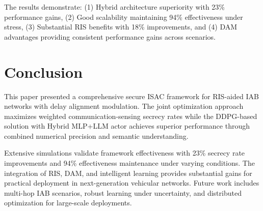 \documentclass[conference]{IEEEtran}
\begin{document}
The results demonstrate: (1) Hybrid architecture superiority with 23\% performance gains, (2) Good scalability maintaining 94\% effectiveness under stress, (3) Substantial RIS benefits with 18\% improvements, and (4) DAM advantages providing consistent performance gains across scenarios.

\section{Conclusion}

This paper presented a comprehensive secure ISAC framework for RIS-aided IAB networks with delay alignment modulation. The joint optimization approach maximizes weighted communication-sensing secrecy rates while the DDPG-based solution with Hybrid MLP+LLM actor achieves superior performance through combined numerical precision and semantic understanding.

Extensive simulations validate framework effectiveness with 23\% secrecy rate improvements and 94\% effectiveness maintenance under varying conditions. The integration of RIS, DAM, and intelligent learning provides substantial gains for practical deployment in next-generation vehicular networks. Future work includes multi-hop IAB scenarios, robust learning under uncertainty, and distributed optimization for large-scale deployments.

\balance


\end{document}
